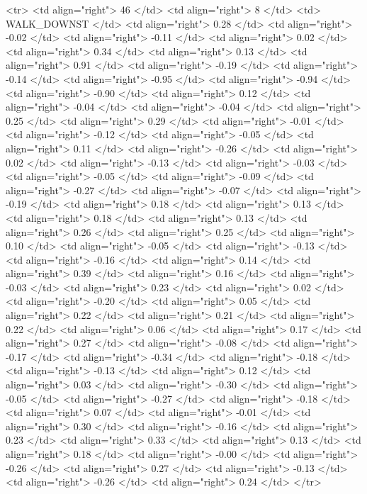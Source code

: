   <tr> <td align="right"> 46 </td> <td align="right">   8 </td> <td> WALK_DOWNST </td> <td align="right"> 0.28 </td> <td align="right"> -0.02 </td> <td align="right"> -0.11 </td> <td align="right"> 0.02 </td> <td align="right"> 0.34 </td> <td align="right"> 0.13 </td> <td align="right"> 0.91 </td> <td align="right"> -0.19 </td> <td align="right"> -0.14 </td> <td align="right"> -0.95 </td> <td align="right"> -0.94 </td> <td align="right"> -0.90 </td> <td align="right"> 0.12 </td> <td align="right"> -0.04 </td> <td align="right"> -0.04 </td> <td align="right"> 0.25 </td> <td align="right"> 0.29 </td> <td align="right"> -0.01 </td> <td align="right"> -0.12 </td> <td align="right"> -0.05 </td> <td align="right"> 0.11 </td> <td align="right"> -0.26 </td> <td align="right"> 0.02 </td> <td align="right"> -0.13 </td> <td align="right"> -0.03 </td> <td align="right"> -0.05 </td> <td align="right"> -0.09 </td> <td align="right"> -0.27 </td> <td align="right"> -0.07 </td> <td align="right"> -0.19 </td> <td align="right"> 0.18 </td> <td align="right"> 0.13 </td> <td align="right"> 0.18 </td> <td align="right"> 0.13 </td> <td align="right"> 0.26 </td> <td align="right"> 0.25 </td> <td align="right"> 0.10 </td> <td align="right"> -0.05 </td> <td align="right"> -0.13 </td> <td align="right"> -0.16 </td> <td align="right"> 0.14 </td> <td align="right"> 0.39 </td> <td align="right"> 0.16 </td> <td align="right"> -0.03 </td> <td align="right"> 0.23 </td> <td align="right"> 0.02 </td> <td align="right"> -0.20 </td> <td align="right"> 0.05 </td> <td align="right"> 0.22 </td> <td align="right"> 0.21 </td> <td align="right"> 0.22 </td> <td align="right"> 0.06 </td> <td align="right"> 0.17 </td> <td align="right"> 0.27 </td> <td align="right"> -0.08 </td> <td align="right"> -0.17 </td> <td align="right"> -0.34 </td> <td align="right"> -0.18 </td> <td align="right"> -0.13 </td> <td align="right"> 0.12 </td> <td align="right"> 0.03 </td> <td align="right"> -0.30 </td> <td align="right"> -0.05 </td> <td align="right"> -0.27 </td> <td align="right"> -0.18 </td> <td align="right"> 0.07 </td> <td align="right"> -0.01 </td> <td align="right"> 0.30 </td> <td align="right"> -0.16 </td> <td align="right"> 0.23 </td> <td align="right"> 0.33 </td> <td align="right"> 0.13 </td> <td align="right"> 0.18 </td> <td align="right"> -0.00 </td> <td align="right"> -0.26 </td> <td align="right"> 0.27 </td> <td align="right"> -0.13 </td> <td align="right"> -0.26 </td> <td align="right"> 0.24 </td> </tr>
